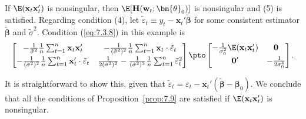 \begin{example}
If $\E(\mathbf{x}_t \mathbf{x}_t')$ is nonsingular, then $\E[\mathbf{H}(\mathbf{w}_t; \bm{\theta}_0)]$ is nonsingular and (5) is satisfied. Regarding condition (4), let $\tilde{\varepsilon}_t \equiv y_t - \mathbf{x}_t'\tilde{\bm{\beta}}$ for some consistent estimator $\tilde{\bm{\beta}}$ and $\tilde{\sigma}^2$. Condition (\ref{eq:7.3.8}) in this example is
\begin{equation}
\label{eq:7.3.19}
\begin{bmatrix} -\frac{1}{\tilde{\sigma}^2}\frac{1}{n}\sum_{t=1}^{n}\mathbf{x}_t \mathbf{x}_t' & -\frac{1}{(\tilde{\sigma}^2)^2}\frac{1}{n}\sum_{t=1}^{n}\mathbf{x}_t \cdot \tilde{\varepsilon}_t \\[4pt] -\frac{1}{(\tilde{\sigma}^2)^2}\frac{1}{n}\sum_{t=1}^{n}\mathbf{x}_t' \cdot \tilde{\varepsilon}_t & \frac{1}{2(\tilde{\sigma}^2)^2} - \frac{1}{(\tilde{\sigma}^2)^3}\frac{1}{n}\sum_{t=1}^{n}\tilde{\varepsilon}_t^2 \end{bmatrix} \pto \begin{bmatrix} -\frac{1}{\sigma_0^2}\E(\mathbf{x}_t \mathbf{x}_t') & \mathbf{0} \\[4pt] \mathbf{0}' & -\frac{1}{2\sigma_0^4} \end{bmatrix}.
\end{equation}

It is straightforward to show this, given that $\tilde{\varepsilon}_t = \varepsilon_t - \mathbf{x}_t'(\tilde{\bm{\beta}} - \bm{\beta}_0)$. We conclude that all the conditions of Proposition~\ref{prop:7.9} are satisfied if $\E(\mathbf{x}_t \mathbf{x}_t')$ is nonsingular.
\end{example}

